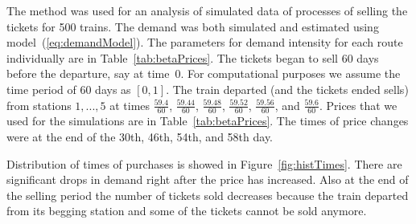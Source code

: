 The method was used for an analysis of simulated data of processes of selling the tickets for 500 trains. The demand was both simulated and estimated using model~(\ref{eq:demandModel}). The parameters for demand intensity for each route individually are in Table~\ref{tab:betaPrices}. The tickets began to sell 60 days before the departure, say at time~$0$. For computational purposes we assume the time period of 60 days as $[0,1]$. The train departed (and the tickets ended sells) from stations $1, ..., 5$ at times $\frac{59.4}{60}$, $\frac{59.44}{60}$, $\frac{59.48}{60}$, $\frac{59.52}{60}$, $\frac{59.56}{60}$, and $\frac{59.6}{60}$. Prices that we used for the simulations are in Table~\ref{tab:betaPrices}. The times of price changes were at the end of the 30th, 46th, 54th, and 58th day.

Distribution of times of purchases is showed in Figure~\ref{fig:histTimes}. There are significant drops in demand right after the price has increased. Also at the end of the selling period the number of tickets sold decreases because the train departed from its begging station and some of the tickets cannot be sold anymore.

